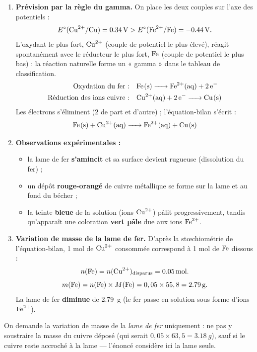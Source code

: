 \documentclass[11pt]{article}
\begin{document}
\begin{corrige}
\begin{enumerate}
\item \textbf{Prévision par la règle du gamma.} On place les deux couples sur l'axe des potentiels :
\[ E^\circ(\ce{Cu^2+}/\ce{Cu}) = \SI{+0,34}{V} > E^\circ(\ce{Fe^2+}/\ce{Fe}) = \SI{-0,44}{V}. \]
L'oxydant le plus fort, $\ce{Cu^2+}$ (couple de potentiel le plus élevé), réagit spontanément avec le réducteur le plus fort, $\ce{Fe}$ (couple de potentiel le plus bas) : la réaction naturelle forme un « gamma » dans le tableau de classification.
\begin{align*}
\text{Oxydation du fer :}\quad & \ce{Fe(s) -> Fe^2+(aq) + 2e-} \\
\text{Réduction des ions cuivre :}\quad & \ce{Cu^2+(aq) + 2e- -> Cu(s)}
\end{align*}
Les électrons s'éliminent (2 de part et d'autre) ; l'équation-bilan s'écrit :
\[ \ce{Fe(s) + Cu^2+(aq) -> Fe^2+(aq) + Cu(s)} \]
\item \textbf{Observations expérimentales :}
\begin{itemize}
\item la lame de fer \textbf{s'amincit} et sa surface devient rugueuse (dissolution du fer) ;
\item un dépôt \textbf{rouge-orangé} de cuivre métallique se forme sur la lame et au fond du bécher ;
\item la teinte \textbf{bleue} de la solution (ions $\ce{Cu^2+}$) pâlit progressivement, tandis qu'apparaît une coloration \textbf{vert pâle} due aux ions $\ce{Fe^2+}$.
\end{itemize}
\item \textbf{Variation de masse de la lame de fer.} D'après la stœchiométrie de l'équation-bilan, 1 mol de $\ce{Cu^2+}$ consommée correspond à 1 mol de $\ce{Fe}$ dissous :
\[ n(\ce{Fe}) = n(\ce{Cu^2+})_{\text{disparus}} = \SI{0,05}{mol}. \]
\[ m(\ce{Fe}) = n(\ce{Fe}) \times M(\ce{Fe}) = 0,05 \times 55,8 = \SI{2,79}{g}. \]
La lame de fer \textbf{diminue} de \SI{2,79}{g} (le fer passe en solution sous forme d'ions $\ce{Fe^2+}$).
\end{enumerate}
\end{corrige}

\begin{attention}
On demande la variation de masse de la \emph{lame de fer} uniquement : ne pas y soustraire la masse du cuivre déposé (qui serait $0,05 \times 63,5 = \SI{3,18}{g}$), sauf si le cuivre reste accroché à la lame — l'énoncé considère ici la lame seule.
\end{attention}
\end{document}
